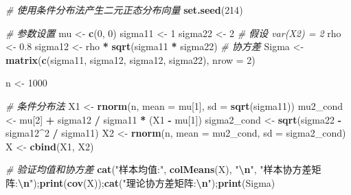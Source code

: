 \documentclass[
]{article}
\newenvironment{Shaded}{\begin{snugshade}}{\end{snugshade}}
\newcommand{\AttributeTok}[1]{\textcolor[rgb]{0.13,0.29,0.53}{#1}}
\newcommand{\CommentTok}[1]{\textcolor[rgb]{0.56,0.35,0.01}{\textit{#1}}}
\newcommand{\DecValTok}[1]{\textcolor[rgb]{0.00,0.00,0.81}{#1}}
\newcommand{\FloatTok}[1]{\textcolor[rgb]{0.00,0.00,0.81}{#1}}
\newcommand{\FunctionTok}[1]{\textcolor[rgb]{0.13,0.29,0.53}{\textbf{#1}}}
\newcommand{\NormalTok}[1]{#1}
\newcommand{\OtherTok}[1]{\textcolor[rgb]{0.56,0.35,0.01}{#1}}
\newcommand{\SpecialCharTok}[1]{\textcolor[rgb]{0.81,0.36,0.00}{\textbf{#1}}}
\newcommand{\StringTok}[1]{\textcolor[rgb]{0.31,0.60,0.02}{#1}}
\begin{document}
\begin{Shaded}
\begin{Highlighting}[]
\CommentTok{\# 使用条件分布法产生二元正态分布向量}
\FunctionTok{set.seed}\NormalTok{(}\DecValTok{214}\NormalTok{)}

\CommentTok{\# 参数设置}
\NormalTok{mu }\OtherTok{\textless{}{-}} \FunctionTok{c}\NormalTok{(}\DecValTok{0}\NormalTok{, }\DecValTok{0}\NormalTok{)}
\NormalTok{sigma11 }\OtherTok{\textless{}{-}} \DecValTok{1}
\NormalTok{sigma22 }\OtherTok{\textless{}{-}} \DecValTok{2}  \CommentTok{\# 假设 var(X2) = 2}
\NormalTok{rho }\OtherTok{\textless{}{-}} \FloatTok{0.8}
\NormalTok{sigma12 }\OtherTok{\textless{}{-}}\NormalTok{ rho }\SpecialCharTok{*} \FunctionTok{sqrt}\NormalTok{(sigma11 }\SpecialCharTok{*}\NormalTok{ sigma22)  }\CommentTok{\# 协方差}
\NormalTok{Sigma }\OtherTok{\textless{}{-}} \FunctionTok{matrix}\NormalTok{(}\FunctionTok{c}\NormalTok{(sigma11, sigma12, sigma12, sigma22), }\AttributeTok{nrow =} \DecValTok{2}\NormalTok{)}

\NormalTok{n }\OtherTok{\textless{}{-}} \DecValTok{1000}

\CommentTok{\# 条件分布法}
\NormalTok{X1 }\OtherTok{\textless{}{-}} \FunctionTok{rnorm}\NormalTok{(n, }\AttributeTok{mean =}\NormalTok{ mu[}\DecValTok{1}\NormalTok{], }\AttributeTok{sd =} \FunctionTok{sqrt}\NormalTok{(sigma11))}
\NormalTok{mu2\_cond }\OtherTok{\textless{}{-}}\NormalTok{ mu[}\DecValTok{2}\NormalTok{] }\SpecialCharTok{+}\NormalTok{ sigma12 }\SpecialCharTok{/}\NormalTok{ sigma11 }\SpecialCharTok{*}\NormalTok{ (X1 }\SpecialCharTok{{-}}\NormalTok{ mu[}\DecValTok{1}\NormalTok{])}
\NormalTok{sigma2\_cond }\OtherTok{\textless{}{-}} \FunctionTok{sqrt}\NormalTok{(sigma22 }\SpecialCharTok{{-}}\NormalTok{ sigma12}\SpecialCharTok{\^{}}\DecValTok{2} \SpecialCharTok{/}\NormalTok{ sigma11)}
\NormalTok{X2 }\OtherTok{\textless{}{-}} \FunctionTok{rnorm}\NormalTok{(n, }\AttributeTok{mean =}\NormalTok{ mu2\_cond, }\AttributeTok{sd =}\NormalTok{ sigma2\_cond)}
\NormalTok{X }\OtherTok{\textless{}{-}} \FunctionTok{cbind}\NormalTok{(X1, X2)}

\CommentTok{\# 验证均值和协方差}
\FunctionTok{cat}\NormalTok{(}\StringTok{"样本均值:"}\NormalTok{, }\FunctionTok{colMeans}\NormalTok{(X), }\StringTok{"}\SpecialCharTok{\textbackslash{}n}\StringTok{"}\NormalTok{,}
\StringTok{"样本协方差矩阵:}\SpecialCharTok{\textbackslash{}n}\StringTok{"}\NormalTok{);}\FunctionTok{print}\NormalTok{(}\FunctionTok{cov}\NormalTok{(X));}\FunctionTok{cat}\NormalTok{(}\StringTok{"理论协方差矩阵:}\SpecialCharTok{\textbackslash{}n}\StringTok{"}\NormalTok{);}\FunctionTok{print}\NormalTok{(Sigma)}
\end{Highlighting}
\end{Shaded}
\end{document}
